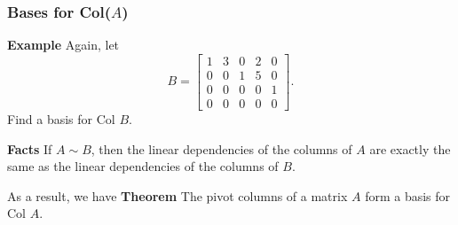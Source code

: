  \begin{frame}[fragile]\frametitle{Bases for Col($A$)}
\textbf{Example}
Again, let \[
B = \left[\begin{array}{rrrrrrrr} 
1 & 3 & 0 & 2 & 0  \\
0 & 0 & 1 & 5 & 0  \\
0 & 0 & 0 & 0 & 1 \\
0 & 0 & 0 & 0 & 0 
\end{array}\right].
\]
Find a basis for Col $B$.



\textbf{Facts}
 If $A \sim B$, then the linear dependencies of the columns of $A$ 
are exactly the same as the linear dependencies of the columns of $B$.



As a result, we have
\textbf{Theorem}
The pivot columns of a matrix $A$ form a basis for Col $A$.

\end{frame}







